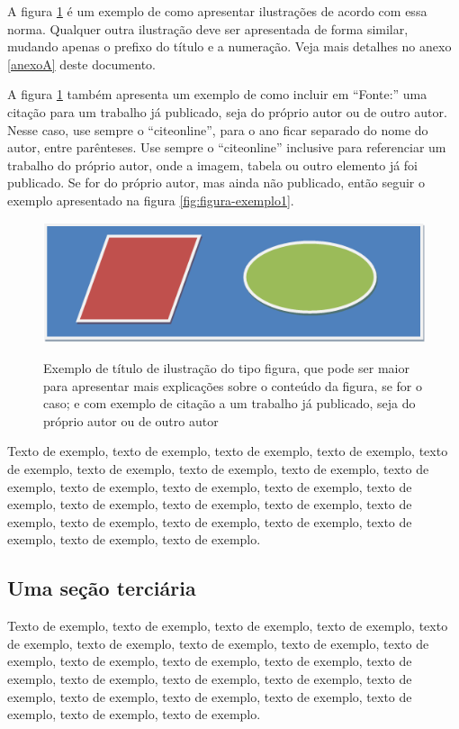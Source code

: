 \documentclass[
	12pt,				%
	oneside,			%
	a4paper,			%
	english,			%
	brazil				%
	]{abntex2ppgsi}
\begin{document}
A figura \ref{fig:figura-exemplo2} é um exemplo de como apresentar ilustrações de acordo com essa norma. Qualquer outra ilustração deve ser apresentada de forma similar, mudando apenas o prefixo do título e a numeração. Veja mais detalhes no anexo \ref{anexoA} deste documento.

A figura \ref{fig:figura-exemplo2} também apresenta um exemplo de como incluir em ``Fonte:'' uma citação para um trabalho já publicado, seja do próprio autor ou de outro autor. Nesse caso, use sempre o ``citeonline'', para o ano ficar separado do nome do autor, entre parênteses. Use sempre o ``citeonline'' inclusive para referenciar um trabalho do próprio autor, onde a imagem, tabela ou outro elemento já foi publicado. Se for do próprio autor, mas ainda não publicado, então seguir o exemplo apresentado na figura \ref{fig:figura-exemplo1}.

\begin{figure}[htbp]
	\centering
  \caption{Exemplo de título de ilustração do tipo figura, que pode ser maior para apresentar mais explicações sobre o conteúdo da figura, se for o caso; e com exemplo de citação a um trabalho já publicado, seja do próprio autor ou de outro autor}
		\includegraphics{figura-exemplo.png}
	\label{fig:figura-exemplo2}
\end{figure}

Texto de exemplo, texto de exemplo, texto de exemplo, texto de exemplo, texto de exemplo, texto de exemplo, texto de exemplo, texto de exemplo, texto de exemplo, texto de exemplo, texto de exemplo, texto de exemplo, texto de exemplo, texto de exemplo, texto de exemplo, texto de exemplo, texto de exemplo, texto de exemplo, texto de exemplo, texto de exemplo, texto de exemplo, texto de exemplo, texto de exemplo.

\subsection{Uma seção terciária}

Texto de exemplo, texto de exemplo, texto de exemplo, texto de exemplo, texto de exemplo, texto de exemplo, texto de exemplo, texto de exemplo, texto de exemplo, texto de exemplo, texto de exemplo, texto de exemplo, texto de exemplo, texto de exemplo, texto de exemplo, texto de exemplo, texto de exemplo, texto de exemplo, texto de exemplo, texto de exemplo, texto de exemplo, texto de exemplo, texto de exemplo.
\end{document}
